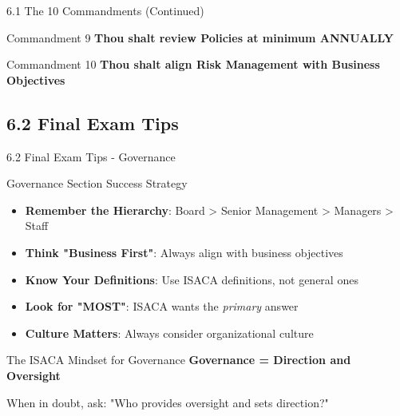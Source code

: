 \documentclass[10pt]{beamer}  %
\begin{document}
	\begin{frame}{6.1 The 10 Commandments (Continued)}
		\begin{block}{Commandment 9}
			\centering
			\textbf{Thou shalt review Policies at minimum ANNUALLY}
		\end{block}
		
		\begin{block}{Commandment 10}
			\centering
			\textbf{Thou shalt align Risk Management with Business Objectives}
		\end{block}
	\end{frame}
	
	\subsection{6.2 Final Exam Tips}
	\begin{frame}{6.2 Final Exam Tips - Governance}
		\begin{block}{Governance Section Success Strategy}
			\begin{itemize}
				\item \textbf{Remember the Hierarchy}: Board > Senior Management > Managers > Staff
				\item \textbf{Think "Business First"}: Always align with business objectives
				\item \textbf{Know Your Definitions}: Use ISACA definitions, not general ones
				\item \textbf{Look for "MOST"}: ISACA wants the \textit{primary} answer
				\item \textbf{Culture Matters}: Always consider organizational culture
			\end{itemize}
		\end{block}
		
		\begin{exampleblock}{The ISACA Mindset for Governance}
			\centering
			\Large{\textbf{Governance = Direction and Oversight}}
			
			\normalsize{When in doubt, ask: "Who provides oversight and sets direction?"}
		\end{exampleblock}
	\end{frame}
	
\end{document}
